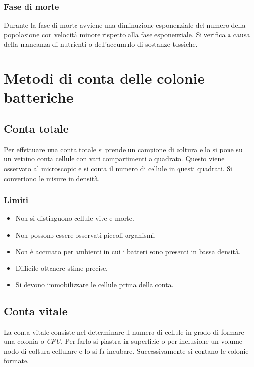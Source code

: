 		\subsubsection{Fase di morte}
		Durante la fase di morte avviene una diminuzione esponenziale del numero della popolazione con velocit\`a minore rispetto alla fase esponenziale.
		Si verifica a causa della mancanza di nutrienti o dell'accumulo di sostanze tossiche.

\section{Metodi di conta delle colonie batteriche}
	
	\subsection{Conta totale}
	Per effettuare una conta totale si prende un campione di coltura e lo si pone su un vetrino conta cellule con vari compartimenti a quadrato.
	Questo viene osservato al microscopio e si conta il numero di cellule in questi quadrati.
	Si convertono le misure in densit\`a.
		
		\subsubsection{Limiti}
		\begin{multicols}{2}
			\begin{itemize}
				\item Non si distinguono cellule vive e morte.
				\item Non possono essere osservati piccoli organismi.
				\item Non \`e accurato per ambienti in cui i batteri sono presenti in bassa densit\`a.
				\item Difficile ottenere stime precise.
				\item Si devono immobilizzare le cellule prima della conta.
			\end{itemize}
		\end{multicols}

	\subsection{Conta vitale}
	La conta vitale consiste nel determinare il numero di cellule in grado di formare una colonia o \emph{CFU}.
	Per farlo si piastra in superficie o per inclusione un volume nodo di coltura cellulare e lo si fa incubare.
	Successivamente si contano le colonie formate.

